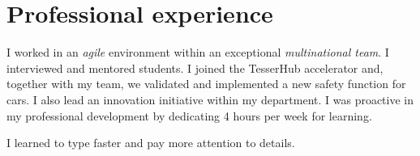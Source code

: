 %


\section{Professional experience}

{
\idea I worked in an \emph{agile} environment within an exceptional \emph{multinational team}.
\idea I interviewed and mentored students.
\idea I joined the TesserHub accelerator and, together with my team, we validated and implemented a new safety function for cars. I also lead an innovation initiative within my department.
\idea I was proactive in my professional development by dedicating 4 hours per week for learning.
}

{
\idea I learned to type faster and pay more attention to details.
}